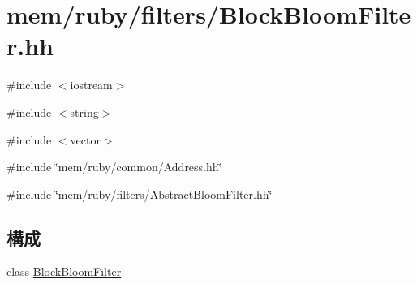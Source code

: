 \hypertarget{BlockBloomFilter_8hh}{
\section{mem/ruby/filters/BlockBloomFilter.hh}
\label{BlockBloomFilter_8hh}
}
{\ttfamily \#include $<$iostream$>$}\par
{\ttfamily \#include $<$string$>$}\par
{\ttfamily \#include $<$vector$>$}\par
{\ttfamily \#include \char`\"{}mem/ruby/common/Address.hh\char`\"{}}\par
{\ttfamily \#include \char`\"{}mem/ruby/filters/AbstractBloomFilter.hh\char`\"{}}\par
\subsection*{構成}
\begin{DoxyCompactItemize}
\item 
class \hyperlink{classBlockBloomFilter}{BlockBloomFilter}
\end{DoxyCompactItemize}
